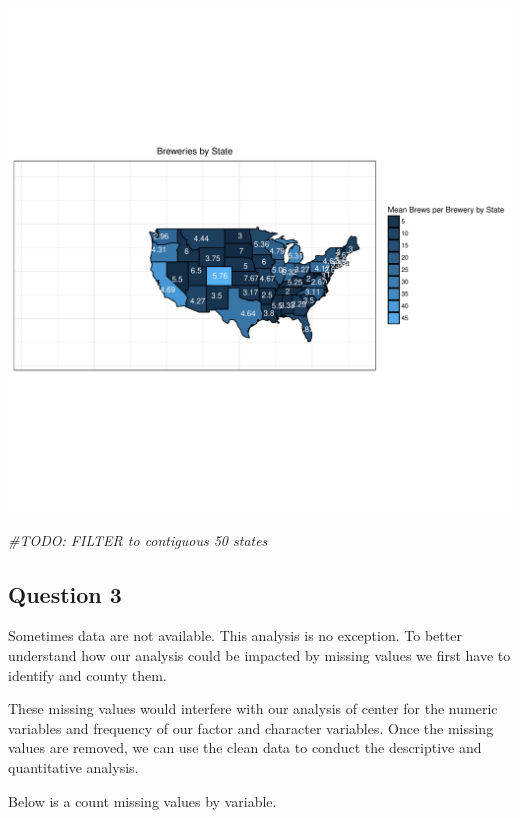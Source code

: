 \documentclass[]{article}
\newenvironment{Shaded}{\begin{snugshade}}{\end{snugshade}}
\newcommand{\CommentTok}[1]{\textcolor[rgb]{0.56,0.35,0.01}{\textit{#1}}}
\begin{document}
\begin{center}\includegraphics{Analysis_Final_files/figure-latex/unnamed-chunk-15-1} \end{center}

\begin{Shaded}
\begin{Highlighting}[]
\CommentTok{#TODO: FILTER to contiguous 50 states}
\end{Highlighting}
\end{Shaded}

\subsection{Question 3}\label{question-3}

Sometimes data are not available. This analysis is no exception. To
better understand how our analysis could be impacted by missing values
we first have to identify and county them.

These missing values would interfere with our analysis of center for the
numeric variables and frequency of our factor and character variables.
Once the missing values are removed, we can use the clean data to
conduct the descriptive and quantitative analysis.

Below is a count missing values by variable.
\end{document}
